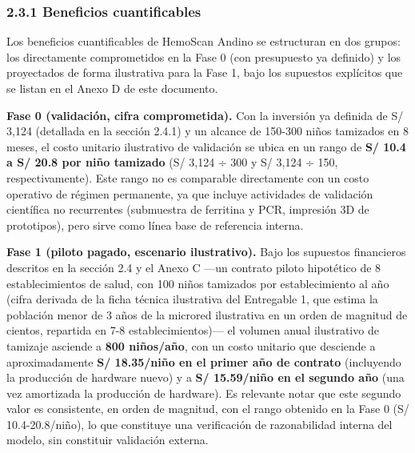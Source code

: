 \documentclass[11pt,a4paper]{article}
\begin{document}
\subsubsection{2.3.1 Beneficios cuantificables}\label{beneficios-cuantificables}

Los beneficios cuantificables de HemoScan Andino se estructuran en dos grupos: los directamente comprometidos en la Fase 0 (con presupuesto ya definido) y los proyectados de forma ilustrativa para la Fase 1, bajo los supuestos explícitos que se listan en el Anexo D de este documento.

\textbf{Fase 0 (validación, cifra comprometida).} Con la inversión ya definida de S/ 3,124 (detallada en la sección 2.4.1) y un alcance de 150-300 niños tamizados en 8 meses, el costo unitario ilustrativo de validación se ubica en un rango de \textbf{S/ 10.4 a S/ 20.8 por niño tamizado} (S/ 3,124 ÷ 300 y S/ 3,124 ÷ 150, respectivamente). Este rango no es comparable directamente con un costo operativo de régimen permanente, ya que incluye actividades de validación científica no recurrentes (submuestra de ferritina y PCR, impresión 3D de prototipos), pero sirve como línea base de referencia interna.

\textbf{Fase 1 (piloto pagado, escenario ilustrativo).} Bajo los supuestos financieros descritos en la sección 2.4 y el Anexo C ---un contrato piloto hipotético de 8 establecimientos de salud, con 100 niños tamizados por establecimiento al año (cifra derivada de la ficha técnica ilustrativa del Entregable 1, que estima la población menor de 3 años de la microred ilustrativa en un orden de magnitud de cientos, repartida en 7-8 establecimientos)--- el volumen anual ilustrativo de tamizaje asciende a \textbf{800 niños/año}, con un costo unitario que desciende a aproximadamente \textbf{S/ 18.35/niño en el primer año de contrato} (incluyendo la producción de hardware nuevo) y a \textbf{S/ 15.59/niño en el segundo año} (una vez amortizada la producción de hardware). Es relevante notar que este segundo valor es consistente, en orden de magnitud, con el rango obtenido en la Fase 0 (S/ 10.4-20.8/niño), lo que constituye una verificación de razonabilidad interna del modelo, sin constituir validación externa.
\end{document}
